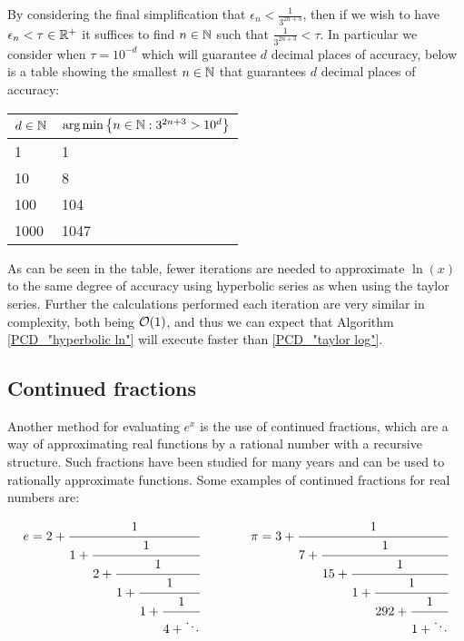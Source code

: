 By considering the final simplification that \(\epsilon_n < \frac{1}{3^{2n+3}}\), then if we wish to have \(\epsilon_n < \tau \in \mathbb{R}^+\) it suffices to find \(n \in \mathbb{N}\) such that \(\frac{1}{3^{2n+3}} < \tau\). In particular we consider when \(\tau = 10^{-d}\) which will guarantee \(d\) decimal places of accuracy, below is a table showing the smallest \(n \in \mathbb{N}\) that guarantees \(d\) decimal places of accuracy:

\begin{center}
\begin{tabular}{|l|l|}
\hline
\(d \in \mathbb{N}\) 
	& \(\textrm{arg}\min\left\{n \in \mathbb{N} : 3^{2n+3} > 10^d\right\}\)\\\hline
1 & 1\\\hline
10 & 8\\\hline
100 & 104\\\hline
1000 & 1047\\\hline
\end{tabular}
\end{center}

As can be seen in the table, fewer iterations are needed to approximate \(\ln(x)\) to the same degree of accuracy using hyperbolic series as when using the taylor series. Further the calculations performed each iteration are very similar in complexity, both being \(\mathcal{O}(1)\), and thus we can expect that Algorithm \ref{PCD_"hyperbolic ln"} will execute faster than \ref{PCD_"taylor log"}.

\subsection{Continued fractions}

\theoremstyle{plain}
\newtheorem{equiv cont frac}{Proposition}[subsection]
\newtheorem{odd even conv}[equiv cont frac]{Proposition}

Another method for evaluating \(e^x\) is the use of continued fractions, which are a way of approximating real functions by a rational number with a recursive structure. Such fractions have been studied for many years and can be used to rationally approximate functions. Some examples of continued fractions for real numbers are:

\begin{displaymath}
\begin{array}{c@{\hspace{4em}}c}
e = 2 + \cfrac{1}{1 +
	    \cfrac{1}{2 +
		\cfrac{1}{1 +
		\cfrac{1}{1 +
		\cfrac{1}{4 + \ddots} } } } }&
\pi = 3 + \cfrac{1}{7 + 
		  \cfrac{1}{15 +
		  \cfrac{1}{1 + 
		  \cfrac{1}{292 +
		  \cfrac{1}{1 + \ddots} } } } }
\end{array}
\end{displaymath}

